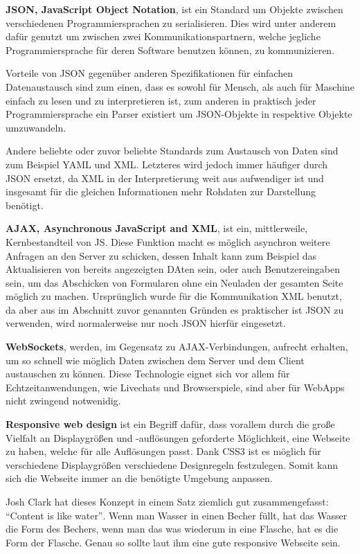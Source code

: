 \documentclass[a4paper,12pt,ngerman,listof=numbered]{scrartcl}      %
\let\oldcite\cite
\renewcommand{\cite}[1]{\textsuperscript{\oldcite{#1}}}
\newcommand{\spacer}{\par\bigskip\noindent}
\begin{document}
	\spacer\textbf{JSON, JavaScript Object Notation}, ist ein Standard um Objekte zwischen verschiedenen Programmiersprachen zu serialisieren. Dies wird unter anderem dafür genutzt um zwischen zwei Kommunikationspartnern, welche jegliche Programmiersprache für deren Software benutzen können, zu kommunizieren.\par
	Vorteile von JSON gegenüber anderen Spezifikationen für einfachen Datenaustausch sind zum einen, dass es sowohl für Mensch, als auch für Maschine einfach zu lesen und zu interpretieren ist, zum anderen in praktisch jeder Programmiersprache ein Parser existiert um JSON-Objekte in respektive Objekte umzuwandeln.\cite{json}\par
	Andere beliebte oder zuvor beliebte Standards zum Austausch von Daten sind zum Beispiel YAML und XML. Letzteres wird jedoch immer häufiger durch JSON ersetzt, da XML in der Interpretierung weit aus aufwendiger ist und insgesamt für die gleichen Informationen mehr Rohdaten zur Darstellung benötigt.\par
	
	\spacer\textbf{AJAX, Asynchronous JavaScript and XML}, ist ein, mittlerweile, Kernbestandteil von JS. Diese Funktion macht es möglich asynchron weitere Anfragen an den Server zu schicken, dessen Inhalt kann zum Beispiel das Aktualisieren von bereits angezeigten DAten sein, oder auch Benutzereingaben sein, um das Abschicken von Formularen ohne ein Neuladen der gesamten Seite möglich zu machen. Ursprünglich wurde für die Kommunikation XML benutzt, da aber aus im Abschnitt zuvor genannten Gründen es praktischer ist JSON zu verwenden, wird normalerweise nur noch JSON hierfür eingesetzt.\cite{ajaxWiki}\par
	
	\spacer\textbf{WebSockets}, werden, im Gegensatz zu AJAX-Verbindungen, aufrecht erhalten, um so schnell wie möglich Daten zwischen dem Server und dem Client austauschen zu können. Diese Technologie eignet sich vor allem für Echtzeitanwendungen, wie Livechats und Browserspiele, sind aber für WebApps nicht zwingend notwenidig.\cite{websocketWiki}\par
	
	\spacer\textbf{Responsive web design} ist ein Begriff dafür, dass vorallem durch die große Vielfalt an Displaygrößen und -auflösungen geforderte Möglichkeit, eine Webseite zu haben, welche für alle Auflösungen passt. Dank CSS3 ist es möglich für verschiedene Displaygrößen verschiedene Designregeln festzulegen. Somit kann sich die Webseite immer an die benötigte Umgebung anpassen.\par
	Josh Clark hat dieses Konzept in einem Satz ziemlich gut zusammengefasst: ``Content is like water''\cite{wikiResponsive}. Wenn man Wasser in einen Becher füllt, hat das Wasser die Form des Bechers, wenn man das was wiederum in eine Flasche, hat es die Form der Flasche. Genau so sollte laut ihm eine gute responsive Webseite sein.\par
	
\end{document}
